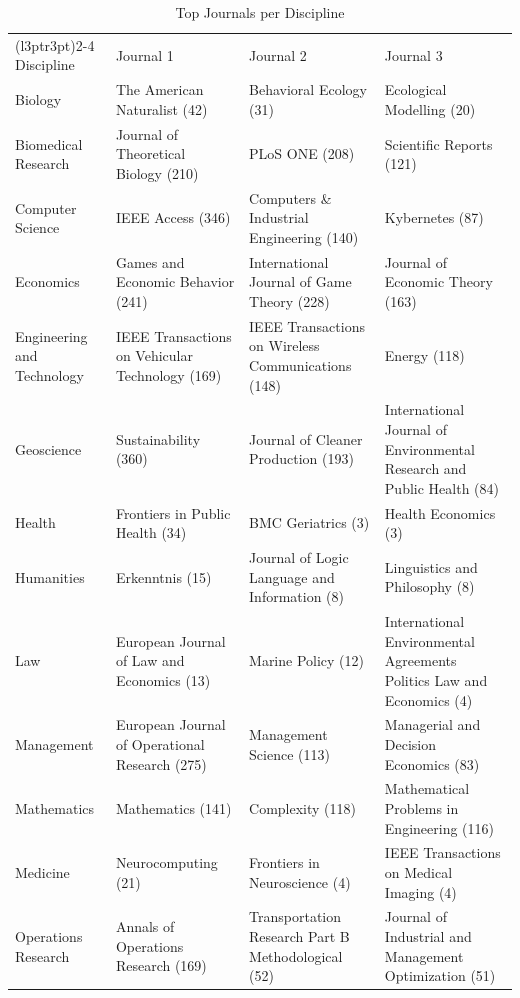\documentclass[
  12pt,
]{article}
\begin{document}
\begin{longtable}[t]{>{\raggedright\arraybackslash}p{4cm}>{\raggedright\arraybackslash}p{4cm}>{\raggedright\arraybackslash}p{4cm}>{\raggedright\arraybackslash}p{4cm}}
\caption{\label{tab:journal_discipline_dist_tbl}Top Journals per Discipline}\\
\toprule
\multicolumn{1}{c}{ } & \multicolumn{3}{c}{Top Journals per discipline (Descending Order)} \\
\cmidrule(l{3pt}r{3pt}){2-4}
Discipline & Journal 1 & Journal 2 & Journal 3\\
\midrule
Biology & The American Naturalist (42) & Behavioral Ecology (31) & Ecological Modelling (20)\\
Biomedical Research & Journal of Theoretical Biology (210) & PLoS ONE (208) & Scientific Reports (121)\\
Computer Science & IEEE Access (346) & Computers \& Industrial Engineering (140) & Kybernetes (87)\\
Economics & Games and Economic Behavior (241) & International Journal of Game Theory (228) & Journal of Economic Theory (163)\\
Engineering and Technology & IEEE Transactions on Vehicular Technology (169) & IEEE Transactions on Wireless Communications (148) & Energy (118)\\
Geoscience & Sustainability (360) & Journal of Cleaner Production (193) & International Journal of Environmental Research and Public Health (84)\\
Health & Frontiers in Public Health (34) & BMC Geriatrics (3) & Health Economics (3)\\
Humanities & Erkenntnis (15) & Journal of Logic Language and Information (8) & Linguistics and Philosophy (8)\\
Law & European Journal of Law and Economics (13) & Marine Policy (12) & International Environmental Agreements Politics Law and Economics (4)\\
Management & European Journal of Operational Research (275) & Management Science (113) & Managerial and Decision Economics (83)\\
Mathematics & Mathematics (141) & Complexity (118) & Mathematical Problems in Engineering (116)\\
Medicine & Neurocomputing (21) & Frontiers in Neuroscience (4) & IEEE Transactions on Medical Imaging (4)\\
Operations Research & Annals of Operations Research (169) & Transportation Research Part B Methodological (52) & Journal of Industrial and Management Optimization (51)\\

\end{longtable}
\end{document}
